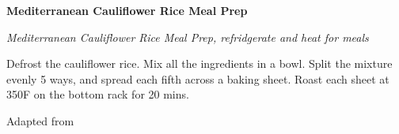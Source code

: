 \documentclass[../recipe-collections/cooking.tex]{subfiles}
\begin{document}
\begin{recipe}{\textbf{Mediterranean Cauliflower Rice Meal Prep}}{}{}

  \freeform{}\textit{Mediterranean Cauliflower Rice Meal Prep, refridgerate and heat for meals}


  Defrost the cauliflower rice. Mix all the ingredients in a bowl.
  Split the mixture evenly 5 ways, and spread each fifth across a 
  baking sheet. Roast each sheet at 350\0F on the bottom rack for 
  20 mins.

  \freeform{}\hrulefill{}

\end{recipe}

Adapted from  \autocite{curp_franziska_spritzler_2021}
\end{document}
